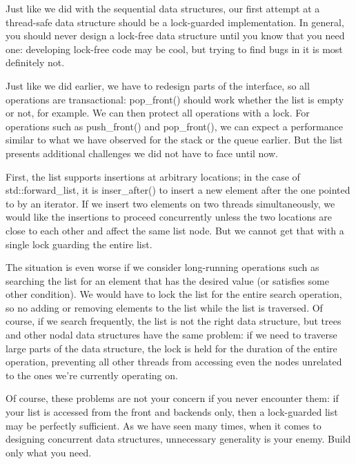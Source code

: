 Just like we did with the sequential data structures, our first attempt at a thread-safe data structure should be a lock-guarded implementation. In general, you should never design a lock-free data structure until you know that you need one: developing lock-free code may be cool, but trying to find bugs in it is most definitely not. 

Just like we did earlier, we have to redesign parts of the interface, so all operations are transactional: pop\_front() should work whether the list is empty or not, for example. We can then protect all operations with a lock. For operations such as push\_front() and pop\_front(), we can expect a performance similar to what we have observed for the stack or the queue earlier. But the list presents additional challenges we did not have to face until now. 

First, the list supports insertions at arbitrary locations; in the case of std::forward\_list, it is inser\_after() to insert a new element after the one pointed to by an iterator. If we insert two elements on two threads simultaneously, we would like the insertions to proceed concurrently unless the two locations are close to each other and affect the same list node. But we cannot get that with a single lock guarding the entire list. 

The situation is even worse if we consider long-running operations such as searching the list for an element that has the desired value (or satisfies some other condition). We would have to lock the list for the entire search operation, so no adding or removing elements to the list while the list is traversed. Of course, if we search frequently, the list is not the right data structure, but trees and other nodal data structures have the same problem: if we need to traverse large parts of the data structure, the lock is held for the duration of the entire operation, preventing all other threads from accessing even the nodes unrelated to the ones we're currently operating on.

Of course, these problems are not your concern if you never encounter them: if your list is accessed from the front and backends only, then a lock-guarded list may be perfectly sufficient. As we have seen many times, when it comes to designing concurrent data structures, unnecessary generality is your enemy. Build only what you need.

